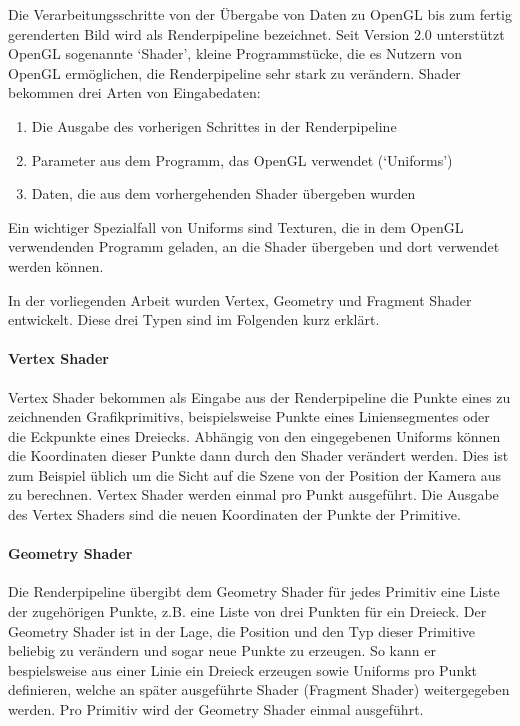\documentclass[a4paper,fontsize=12pt,toc=bib,halfparskip]{scrartcl}
\begin{document}
Die Verarbeitungsschritte von der \"Ubergabe von Daten zu OpenGL bis zum fertig gerenderten Bild wird als Renderpipeline bezeichnet. Seit Version 2.0 unterst\"utzt OpenGL sogenannte `Shader', kleine Programmst\"ucke, die es Nutzern von OpenGL erm\"oglichen, die Renderpipeline sehr stark zu ver\"andern. Shader bekommen drei Arten von Eingabedaten:

\begin{enumerate}
	\item Die Ausgabe des vorherigen Schrittes in der Renderpipeline
	\item Parameter aus dem Programm, das OpenGL verwendet (`Uniforms')
	\item Daten, die aus dem vorhergehenden Shader \"ubergeben wurden
\end{enumerate}

Ein wichtiger Spezialfall von Uniforms sind Texturen, die in dem OpenGL verwendenden Programm geladen, an die Shader \"ubergeben und dort verwendet werden k\"onnen.

In der vorliegenden Arbeit wurden Vertex, Geometry und Fragment Shader entwickelt. Diese drei Typen sind im Folgenden kurz erkl\"art.

\paragraph{Vertex Shader}
Vertex Shader bekommen als Eingabe aus der Renderpipeline die Punkte eines zu zeichnenden Grafikprimitivs, beispielsweise Punkte eines Liniensegmentes oder die Eckpunkte eines Dreiecks. Abh\"angig von den eingegebenen Uniforms k\"onnen die Koordinaten dieser Punkte dann durch den Shader ver\"andert werden. Dies ist zum Beispiel \"ublich um die Sicht auf die Szene von der Position der Kamera aus zu berechnen. Vertex Shader werden einmal pro Punkt ausgef\"uhrt. Die Ausgabe des Vertex Shaders sind die neuen Koordinaten der Punkte der Primitive.

\paragraph{Geometry Shader}
Die Renderpipeline \"ubergibt dem Geometry Shader f\"ur jedes Primitiv eine Liste der zugeh\"origen Punkte, z.B. eine Liste von drei Punkten f\"ur ein Dreieck. Der Geometry Shader ist in der Lage, die Position und den Typ dieser Primitive beliebig zu ver\"andern und sogar neue Punkte zu erzeugen. So kann er bespielsweise aus einer Linie ein Dreieck erzeugen sowie Uniforms pro Punkt definieren, welche an sp\"ater ausgef\"uhrte Shader (Fragment Shader) weitergegeben werden. Pro Primitiv wird der Geometry Shader einmal ausgef\"uhrt.
\end{document}
